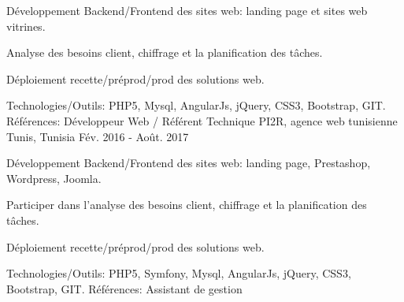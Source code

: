 \begin{cventries}
    {
      \begin{cvitems}
        \item {Développement Backend/Frontend des sites web: landing page et sites web vitrines.}
        \item {Analyse des besoins client, chiffrage et la planification des tâches.}
        \item {Déploiement recette/préprod/prod des solutions web.}
      \end{cvitems}
    }
    {\textcolor{awesome}{Technologies/Outils: } {\color{graytext}}  {PHP5, Mysql, AngularJs, jQuery, CSS3, Bootstrap, GIT.}}
    {Références:} 
    {\href{http://www.cooperons.com/}{} \break
    \href{http://www.tisc.tn/ }{} \break
    }
  \techentries
    {Développeur Web / Référent Technique}
    {PI2R, agence web tunisienne}
    {Tunis, Tunisia}
    {Fév. 2016 - Août. 2017}
    {
      \begin{cvitems}
        \item {Développement Backend/Frontend des sites web: landing page, Prestashop, Wordpress, Joomla.}
        \item {Participer dans l'analyse des besoins client, chiffrage et la planification des tâches.}
        \item {Déploiement recette/préprod/prod des solutions web.}
      \end{cvitems}
    }
    {\textcolor{awesome}{Technologies/Outils: } {\color{graytext}}  {PHP5, Symfony, Mysql, AngularJs, jQuery, CSS3, Bootstrap, GIT.}}
    {Références:} 
    {
      \href{http://www.tuttosport.tn/}{} \break
      \href{http://www.milddream.com/fr/ }{} \break
      \href{https://www.tvsoftconsult.com/ }{} \break
      \href{http://www.ordre-medecins.org.tn/fr/ }{} \break
      \href{http://orthodontiste-narimen-djerbi.com/ }{} \break
    }
  \techentries
    {Assistant de gestion}

\end{cventries}
